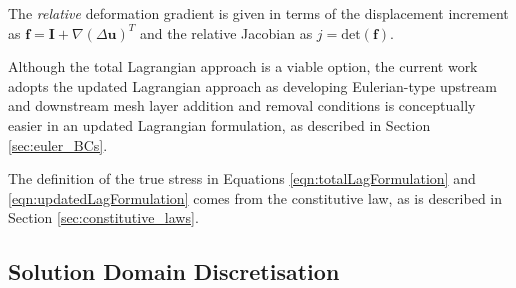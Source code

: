 \documentclass[sn-mathphys,Numbered,draft]{sn-jnl}%
\begin{document}
The \emph{relative} deformation gradient is given in terms of the displacement increment as $\mathbf{f}=\mathbf{I}+\nabla(\Delta \mathbf{u})^T$ and the relative Jacobian as $j = \text{det}(\mathbf{f})$.

Although the total Lagrangian approach is a viable option, the current work adopts the updated Lagrangian approach as developing Eulerian-type upstream and downstream mesh layer addition and removal conditions is conceptually easier in an updated Lagrangian formulation, as described in Section \ref{sec:euler_BCs}.

The definition of the true stress in Equations \ref{eqn:totalLagFormulation} and \ref{eqn:updatedLagFormulation} comes from the constitutive law, as is described in Section \ref{sec:constitutive_laws}.


\subsection{Solution Domain Discretisation} \label{sec:solDomDiscret}


\end{document}
